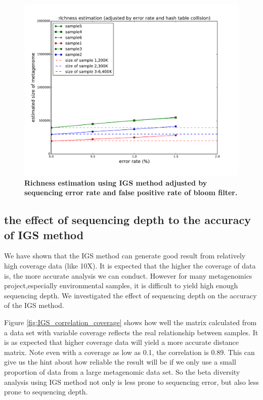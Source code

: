 \documentclass{article}
\begin{document}
\begin{figure}[!ht]
 \centerline{\includegraphics[width=6in]{./figures/alpha_by_error_full_adjust.pdf}}
\caption{\bf Richness estimation using IGS method adjusted by sequencing error
rate and false positive rate of bloom filter.}
\label{fig:IGS_richness_adjustment}
\end{figure}


\subsection{the effect of sequencing depth to the accuracy of IGS method}


We have shown that the IGS method can generate good result from relatively
high coverage data (like 10X). It is expected that the higher the coverage
of data is, the more accurate analysis we can conduct. However for many 
metagenomics project,especially environmental samples, it is difficult
to yield high enough sequencing depth. We investigated the effect of 
sequencing depth on the accuracy of the IGS method.


Figure \ref{fig:IGS_correlation_coverage} shows how well the matrix 
calculated from a data set with variable coverage 
reflects the real relationship between samples. It is as expected that 
higher coverage data will yield a more accurate distance matrix.
Note even with a coverage as low as 0.1, the correlation is 0.89. 
This can give us the hint about how reliable the result will be if 
we only use a small proportion of data from a large metagenomic data set.
So the beta diversity analysis using IGS method not only is less prone to
sequencing error, but also less prone to sequencing depth.
\end{document}
